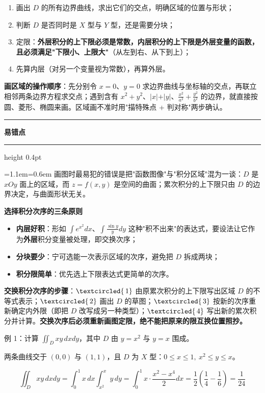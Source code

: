 \documentclass[11pt,openany,UTF8]{ctexbook}
\newcommand{\circled}[1]{\textcircled{\scriptsize\,#1}}
\newcommand{\callouthead}[2]{%
  \par\addvspace{7pt}\noindent
  {\color{#1}\rule[-0.15em]{3pt}{1.05em}}\hspace{0.5em}%
  {\bfseries\color{#1}#2}\par\nobreak\vspace{-0.35em}%
  {\color{rulesep}\hrule height 0.4pt}\nobreak\vspace{0.45em}%
  \begingroup\small\setlength{\parindent}{0pt}%
  \leftskip=1.1em\rightskip=0.6em\noindent\ignorespaces}
\newcommand{\calloutend}{\par\endgroup\addvspace{7pt}}
\newenvironment{callwarn}[1]{\callouthead{warnbar}{#1}}{\calloutend}
\begin{document}
\begin{enumerate}
\item 画出 $D$ 的所有边界曲线，求出它们的交点，明确区域的位置与形状；
\item 判断 $D$ 是否同时是 $X$ 型与 $Y$ 型，还是需要分块；
\item 定限：\textbf{外层积分的上下限必须是常数，内层积分的上下限是外层变量的函数，且必须满足"下限小、上限大"}（从左到右、从下到上）；
\item 先算内层（对另一个变量视为常数），再算外层。
\end{enumerate}
\textbf{画区域的操作顺序}：先分别令 $x=0$、$y=0$ 求边界曲线与坐标轴的交点，再联立相邻两条边界方程求交点；遇到含有 $x^{2}+y^{2}$、$\vert x\vert+\vert y\vert$、$\frac{x^{2}}{a^{2}}+\frac{y^{2}}{b^{2}}$ 的边界，就直接按圆、菱形、椭圆来画。区域画不准时用"描特殊点 + 判对称"两步确认。

\begin{callwarn}{易错点}
画图时最易犯的错误是把"函数图像"与"积分区域"混为一谈：$D$ 是 $xOy$ 面上的区域，而 $z=f(x,y)$ 是空间的曲面；累次积分的上下限只由 $D$ 的边界决定，与曲面形状无关。

\end{callwarn}

\textbf{选择积分次序的三条原则}

\begin{itemize}
\item \textbf{内层好积}：形如 $\int e^{x^{2}}dx$、$\int\frac{\sin y}{y}dy$ 这种"积不出来"的表达式，要设法让它作为\textbf{外层}积分变量被处理，即交换次序；
\item \textbf{分块要少}：宁可选能一次表示区域的次序，避免把 $D$ 拆成两块；
\item \textbf{积分限简单}：优先选上下限表达式更简单的次序。
\end{itemize}
\textbf{交换积分次序的步骤}：$\circled{1}$ 由原累次积分的上下限写出区域 $D$ 的不等式表示；$\circled{2}$ 画出 $D$ 的草图；$\circled{3}$ 按新的次序重新确定内外限（即把 $D$ 改写成另一种类型）；$\circled{4}$ 写出新的累次积分并计算。\textbf{交换次序后必须重新画图定限，绝不能把原来的限互换位置照抄。}

例 1：计算 $\iint_{D}xy\,dxdy$，其中 $D$ 由 $y=x^{2}$ 与 $y=x$ 围成。

两条曲线交于 $(0,0)$ 与 $(1,1)$，且 $D$ 为 $X$ 型：$0\le x\le 1,\ x^{2}\le y\le x$。

\[\iint_{D}xy\,dxdy=\int_{0}^{1}x\,dx\int_{x^{2}}^{x}y\,dy=\int_{0}^{1}x\cdot\frac{x^{2}-x^{4}}{2}dx=\frac12\left(\frac14-\frac16\right)=\frac{1}{24}\]
\end{document}
